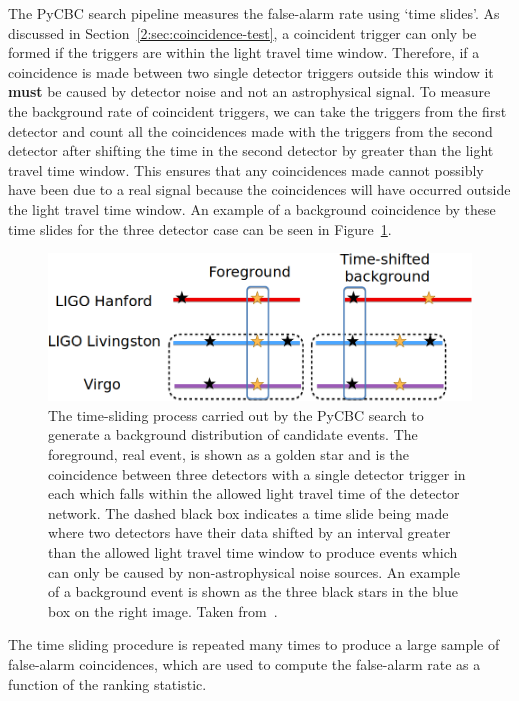 The PyCBC search pipeline measures the false-alarm rate using `time slides'. As discussed in Section~\ref{2:sec:coincidence-test}, a coincident trigger can only be formed if the triggers are within the light travel time window. Therefore, if a coincidence is made between two single detector triggers outside this window it \textbf{must} be caused by detector noise and not an astrophysical signal. To measure the background rate of coincident triggers, we can take the triggers from the first detector and count all the coincidences made with the triggers from the second detector after shifting the time in the second detector by greater than the light travel time window. This ensures that any coincidences made cannot possibly have been due to a real signal because the coincidences will have occurred outside the light travel time window. An example of a background coincidence by these time slides for the three detector case can be seen in Figure~\ref{2:fig:timeslides}.
%
\begin{figure}
    \centering
    \includegraphics[width=0.9\linewidth]{images/2_searches/TimeslideExample.png}
    \caption{The time-sliding process carried out by the PyCBC search to generate a background distribution of candidate events. The foreground, real \gwadj event, is shown as a golden star and is the coincidence between three detectors with a single detector trigger in each which falls within the allowed light travel time of the detector network. The dashed black box indicates a time slide being made where two detectors have their data shifted by an interval greater than the allowed light travel time window to produce events which can only be caused by non-astrophysical noise sources. An example of a background event is shown as the three black stars in the blue box on the right image. Taken from~\cite{PyCBC_global:2020}.}
    \label{2:fig:timeslides}
\end{figure}
%

The time sliding procedure is repeated many times to produce a large sample of false-alarm coincidences, which are used to compute the false-alarm rate as a function of the ranking statistic.

